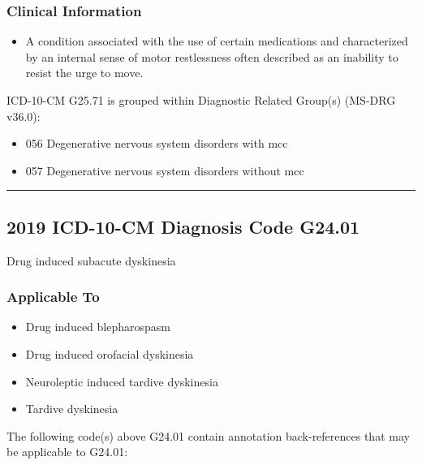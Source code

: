 \begin{paracol}{2}
\begin{leftcolumn}
\hypertarget{clinical-information}{%
\subsubsection{Clinical Information}\label{clinical-information}}

\begin{itemize}
\tightlist
\item
  A condition associated with the use of certain medications and characterized by an internal sense of motor restlessness often described as an inability to resist the urge to move.
\end{itemize}

\noindent ICD-10-CM G25.71 is grouped within Diagnostic Related Group(s) (MS-DRG v36.0):

\begin{itemize}
\tightlist
\item
  056 Degenerative nervous system disorders with mcc
\item
  057 Degenerative nervous system disorders without mcc
\end{itemize}

\begin{center}\rule{0.5\linewidth}{\linethickness}\end{center}

\hypertarget{icd-10-cm-diagnosis-code-g24.01}{%
\subsection{2019 ICD-10-CM Diagnosis Code G24.01}\label{icd-10-cm-diagnosis-code-g24.01}}

\noindent Drug induced subacute dyskinesia

\hypertarget{applicable-to-2}{%
\subsubsection{Applicable To}\label{applicable-to-2}}

\begin{itemize}
\tightlist
\item
  Drug induced blepharospasm
\item
  Drug induced orofacial dyskinesia
\item
  Neuroleptic induced tardive dyskinesia
\item
  Tardive dyskinesia
\end{itemize}

\noindent The following code(s) above G24.01 contain annotation back-references that may be applicable to G24.01:


\end{leftcolumn}
\end{paracol}
